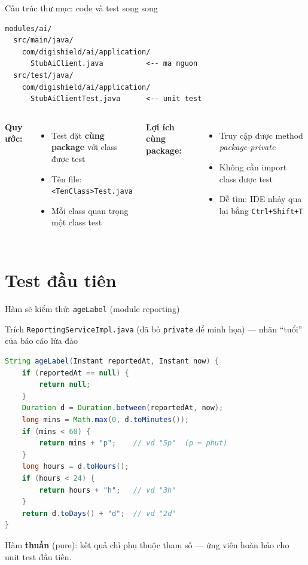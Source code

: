 \documentclass[aspectratio=169,12pt]{beamer}
\begin{document}
\begin{frame}[fragile,shrink=8]{Cấu trúc thư mục: code và test song song}
\begin{lstlisting}[style=nonumber]
modules/ai/
  src/main/java/
    com/digishield/ai/application/
      StubAiClient.java          <-- ma nguon
  src/test/java/
    com/digishield/ai/application/
      StubAiClientTest.java      <-- unit test
\end{lstlisting}
  \vspace{0.2em}
  \begin{columns}
    \textbf{Quy ước:}
    \begin{itemize}
      \item Test đặt \textbf{cùng package} với class được test
      \item Tên file: \texttt{<TenClass>Test.java}
      \item Mỗi class quan trọng một class test
    \end{itemize}
    \textbf{Lợi ích cùng package:}
    \begin{itemize}
      \item Truy cập được method \textit{package-private}
      \item Không cần import class được test
      \item Dễ tìm: IDE nhảy qua lại bằng
            \texttt{Ctrl+Shift+T}
    \end{itemize}
  \end{columns}
\end{frame}

\section{Test đầu tiên}

\begin{frame}[fragile,shrink=8]{Hàm sẽ kiểm thử: \texttt{ageLabel} (module reporting)}
  \begin{block}{\small Trích \texttt{ReportingServiceImpl.java} (đã bỏ \texttt{private} để minh họa) --- nhãn ``tuổi'' của báo cáo lừa đảo}
\begin{lstlisting}[language=java]
String ageLabel(Instant reportedAt, Instant now) {
    if (reportedAt == null) {
        return null;
    }
    Duration d = Duration.between(reportedAt, now);
    long mins = Math.max(0, d.toMinutes());
    if (mins < 60) {
        return mins + "p";    // vd "5p"  (p = phut)
    }
    long hours = d.toHours();
    if (hours < 24) {
        return hours + "h";   // vd "3h"
    }
    return d.toDays() + "d";  // vd "2d"
}
\end{lstlisting}
  \end{block}
  \vspace{-0.3em}
  {\small Hàm \textbf{thuần} (pure): kết quả chỉ phụ thuộc tham số ---
  ứng viên hoàn hảo cho unit test đầu tiên.}
\end{frame}
\end{document}
